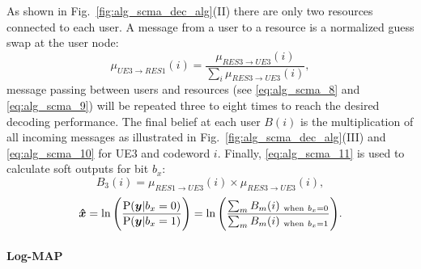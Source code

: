 As shown in Fig.~\ref{fig:alg_scma_dec_alg}(II) there are only two resources
connected to each user. A message from a user to a resource is a normalized
guess swap at the user node:
\begin{equation}
  \label{eq:alg_scma_9}
  \mu_{UE3 \rightarrow RES1}(i) = \frac{\mu_{RES3 \rightarrow UE3}(i)}
  {\sum_i\mu_{RES3 \rightarrow UE3}(i)},
\end{equation}
message passing between users and resources (see \eqref{eq:alg_scma_8} and
\eqref{eq:alg_scma_9}) will be repeated three to eight times to reach the
desired decoding performance. The final belief at each user $B(i)$ is the
multiplication of all incoming messages as illustrated in
Fig.~{\ref{fig:alg_scma_dec_alg}}(III) and \eqref{eq:alg_scma_10} for UE3 and
codeword $i$. Finally, \eqref{eq:alg_scma_11} is used to calculate soft outputs
for bit $b_x$:
\begin{equation}
  \label{eq:alg_scma_10}
  B_3(i) = \mu_{RES1 \rightarrow UE3}(i) \times \mu_{RES3 \rightarrow UE3}(i),
\end{equation}
\begin{equation}
  \label{eq:alg_scma_11}
  \bm{\hat{x}} = \ln \Bigg( \frac{\operatorname{P}(\bm{y}|b_x=0)}{\operatorname{P}(\bm{y}|b_x=1)} \Bigg) =
  \ln \Bigg( \frac{\sum_m B_m(i)_{~\text{when}~b_x=0}}{\sum_m B_m(i)_{~\text{when}~b_x=1}}
  \Bigg).
\end{equation}

\paragraph{Log-MAP}
\label{sec:alg_scma_log-map}

